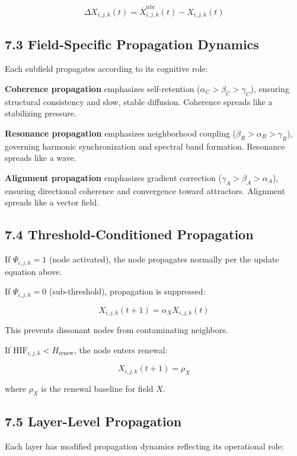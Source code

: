 \[
\Delta X_{i,j,k}(t) = \overline{X}^{\text{nbr}}_{i,j,k}(t) - X_{i,j,k}(t)
\]

\subsection{7.3 Field-Specific Propagation Dynamics}\label{field-specific-propagation-dynamics}

Each subfield propagates according to its cognitive role:

\textbf{Coherence propagation} emphasizes self-retention (\(\alpha_C > \beta_C > \gamma_C\)), ensuring structural consistency and slow, stable diffusion. Coherence spreads like a stabilizing pressure.

\textbf{Resonance propagation} emphasizes neighborhood coupling (\(\beta_R > \alpha_R >
\gamma_R\)), governing harmonic synchronization and spectral band formation. Resonance spreads like a wave.

\textbf{Alignment propagation} emphasizes gradient correction (\(\gamma_A > \beta_A >
\alpha_A\)), ensuring directional coherence and convergence toward attractors. Alignment spreads like a vector field.

\subsection{7.4 Threshold-Conditioned Propagation}\label{threshold-conditioned-propagation}

If \(\Psi_{i,j,k} = 1\) (node activated), the node propagates normally per the update equation above.

If \(\Psi_{i,j,k} = 0\) (sub-threshold), propagation is suppressed:

\[
X_{i,j,k}(t+1) = \alpha_X X_{i,j,k}(t)
\]

This prevents dissonant nodes from contaminating neighbors.

If \(\mathrm{HIF}_{i,j,k} < H_{\text{renew}}\), the node enters renewal:

\[
X_{i,j,k}(t+1) = \rho_X
\]

where \(\rho_X\) is the renewal baseline for field \(X\).

\subsection{7.5 Layer-Level Propagation}\label{layer-level-propagation}

Each layer has modified propagation dynamics reflecting its operational role:

